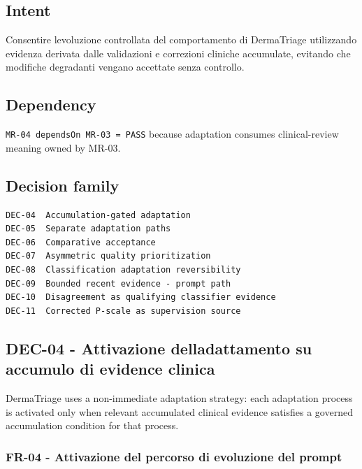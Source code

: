 \documentclass[11pt,a4paper]{article}
\begin{document}
\subsection{Intent}\label{intent-3}

Consentire l\textquotesingle evoluzione controllata del comportamento di
DermaTriage utilizzando evidenza derivata dalle validazioni e correzioni
cliniche accumulate, evitando che modifiche degradanti vengano accettate
senza controllo.

\subsection{Dependency}\label{dependency}

\texttt{MR-04\ dependsOn\ MR-03\ =\ PASS} because adaptation consumes
clinical-review meaning owned by MR-03.

\subsection{Decision family}\label{decision-family}

\begin{verbatim}
DEC-04  Accumulation-gated adaptation
DEC-05  Separate adaptation paths
DEC-06  Comparative acceptance
DEC-07  Asymmetric quality prioritization
DEC-08  Classification adaptation reversibility
DEC-09  Bounded recent evidence - prompt path
DEC-10  Disagreement as qualifying classifier evidence
DEC-11  Corrected P-scale as supervision source
\end{verbatim}

\subsection{DEC-04 - Attivazione dell\textquotesingle adattamento su
accumulo di evidence
clinica}\label{dec-04---attivazione-delladattamento-su-accumulo-di-evidence-clinica}

DermaTriage uses a non-immediate adaptation strategy: each adaptation
process is activated only when relevant accumulated clinical evidence
satisfies a governed accumulation condition for that process.

\subsubsection{FR-04 - Attivazione del percorso di evoluzione del
prompt}\label{fr-04---attivazione-del-percorso-di-evoluzione-del-prompt}
\end{document}
